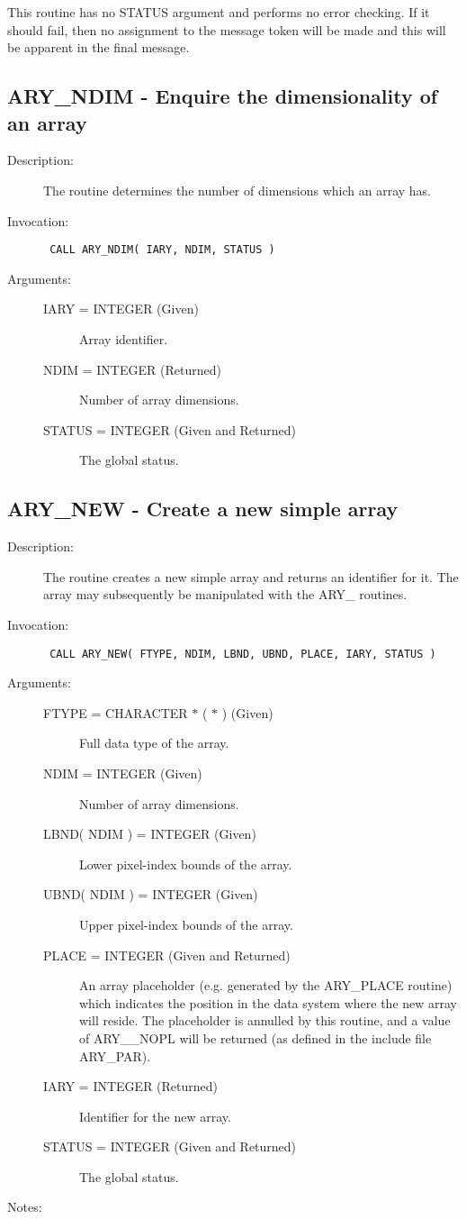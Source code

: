 \documentclass[twoside,11pt]{article}
\newcommand{\xlabel}[1]{}
\newlength{\sstbannerlength}
\newlength{\sstcaptionlength}
\newlength{\sstexampleslength}
\newlength{\sstexampleswidth}
\newcommand{\sstroutine}[3]{
   \goodbreak
   \rule{\textwidth}{0.5mm}
   \vspace{-7ex}
   \newline
   \settowidth{\sstbannerlength}{{\Large {\bf #1}}}
   \setlength{\sstcaptionlength}{\textwidth}
   \setlength{\sstexampleslength}{\textwidth}
   \addtolength{\sstbannerlength}{0.5em}
   \addtolength{\sstcaptionlength}{-2.0\sstbannerlength}
   \addtolength{\sstcaptionlength}{-5.0pt}
   \settowidth{\sstexampleswidth}{{\bf Examples:}}
   \addtolength{\sstexampleslength}{-\sstexampleswidth}
   \parbox[t]{\sstbannerlength}{\flushleft{\Large {\bf #1}}}
   \parbox[t]{\sstcaptionlength}{\center{\Large #2}}
   \parbox[t]{\sstbannerlength}{\flushright{\Large {\bf #1}}}
   \begin{description}
      #3
   \end{description}
}
\newcommand{\sstdescription}[1]{\item[Description:] #1}
\newcommand{\sstinvocation}[1]{\item[Invocation:]\hspace{0.4em}{\tt #1}}
\newcommand{\sstarguments}[1]{
   \item[Arguments:] \mbox{} \\
   \vspace{-3.5ex}
   \begin{description}
      #1
   \end{description}
}
\newcommand{\sstsubsection}[1]{ \item[{#1}] \mbox{} \\}
\newcommand{\sstnotes}[1]{\item[Notes:] \mbox{} \\[1.3ex] #1}
\newcommand{\sstitemlist}[1]{
  \mbox{} \\
  \vspace{-3.5ex}
  \begin{itemize}
     #1
  \end{itemize}
}
\newcommand{\sstitem}{\item}
\newcommand{\ssttt}{\tt}
\renewcommand{\sstroutine}[3]{
      \subsection{#1\xlabel{#1}-\label{#1}#2}
      \begin{description}
         #3
      \end{description}
   }
\renewcommand{\sstdescription}[1]{\item[Description:]
      \begin{description}
         #1
      \end{description}
   }
\renewcommand{\sstinvocation}[1]{\item[Invocation:]
      \begin{description}
         {\ssttt #1}
      \end{description}
   }
\renewcommand{\sstarguments}[1]{
      \item[Arguments:]
      \begin{description}
         #1
      \end{description}
   }
\renewcommand{\sstsubsection}[1]{\item[{#1}]}
\renewcommand{\sstnotes}[1]{\item[Notes:]
      \begin{description}
         #1
      \end{description}
   }
\newcommand{\sstitemlist}[1]{
      \begin{itemize}
         #1
      \end{itemize}
   }
\begin{document}
\begin{eqn*}
{{{         \sstitem
         This routine has no STATUS argument and performs no error
         checking. If it should fail, then no assignment to the message
         token will be made and this will be apparent in the final
         message.
      }
   }
}
\sstroutine{
   ARY\_NDIM
}{
   Enquire the dimensionality of an array
}{
   \sstdescription{
      The routine determines the number of dimensions which an array
      has.
   }
   \sstinvocation{
      CALL ARY\_NDIM( IARY, NDIM, STATUS )
   }
   \sstarguments{
      \sstsubsection{
         IARY = INTEGER (Given)
      }{
         Array identifier.
      }
      \sstsubsection{
         NDIM = INTEGER (Returned)
      }{
         Number of array dimensions.
      }
      \sstsubsection{
         STATUS = INTEGER (Given and Returned)
      }{
         The global status.
      }
   }
}
\sstroutine{
   ARY\_NEW
}{
   Create a new simple array
}{
   \sstdescription{
      The routine creates a new simple array and returns an identifier
      for it. The array may subsequently be manipulated with the ARY\_
      routines.
   }
   \sstinvocation{
      CALL ARY\_NEW( FTYPE, NDIM, LBND, UBND, PLACE, IARY, STATUS )
   }
   \sstarguments{
      \sstsubsection{
         FTYPE = CHARACTER $*$ ( $*$ ) (Given)
      }{
         Full data type of the array.
      }
      \sstsubsection{
         NDIM = INTEGER (Given)
      }{
         Number of array dimensions.
      }
      \sstsubsection{
         LBND( NDIM ) = INTEGER (Given)
      }{
         Lower pixel-index bounds of the array.
      }
      \sstsubsection{
         UBND( NDIM ) = INTEGER (Given)
      }{
         Upper pixel-index bounds of the array.
      }
      \sstsubsection{
         PLACE = INTEGER (Given and Returned)
      }{
         An array placeholder (e.g. generated by the ARY\_PLACE routine)
         which indicates the position in the data system where the new
         array will reside. The placeholder is annulled by this
         routine, and a value of ARY\_\_NOPL will be returned (as defined
         in the include file ARY\_PAR).
      }
      \sstsubsection{
         IARY = INTEGER (Returned)
      }{
         Identifier for the new array.
      }
      \sstsubsection{
         STATUS = INTEGER (Given and Returned)
      }{
         The global status.
      }
   }
   \sstnotes{
      \sstitemlist{

}}}
\end{eqn*}
\end{document}
